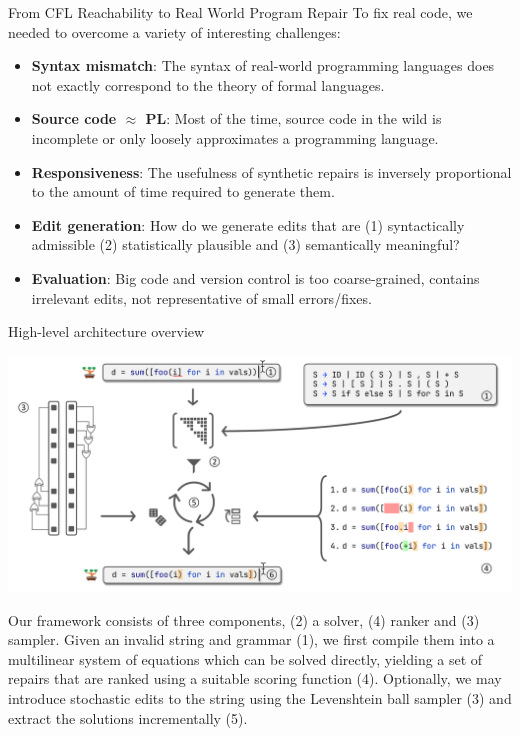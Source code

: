 \documentclass{beamer}
\begin{document}
\begin{frame}[fragile]{From CFL Reachability to Real World Program Repair}
  To fix real code, we needed to overcome a variety of interesting challenges:\vspace{10pt}

  \begin{itemize}
    \item \textbf{Syntax mismatch}: The syntax of real-world programming languages does not exactly correspond to the theory of formal languages.
    \item \textbf{Source code $\approx$ PL}: Most of the time, source code in the wild is incomplete or only loosely approximates a programming language.
    \item \textbf{Responsiveness}: The usefulness of synthetic repairs is inversely proportional to the amount of time required to generate them.
    \item \textbf{Edit generation}: How do we generate edits that are (1) syntactically admissible (2) statistically plausible and (3) semantically meaningful?
    \item \textbf{Evaluation}: Big code and version control is too coarse-grained, contains irrelevant edits, not representative of small errors/fixes.
  \end{itemize}
\end{frame}

\begin{frame}[fragile]{High-level architecture overview}
  \begin{center}
    \includegraphics[width=0.9\linewidth]{../figures/architecture_overview.pdf}
  \end{center}
  \vspace{-10pt}
  \begin{footnotesize}
    Our framework consists of three components, (2) a solver, (4) ranker and (3) sampler. Given an invalid string and grammar (1), we first compile them into a multilinear system of equations which can be solved directly, yielding a set of repairs that are ranked using a suitable scoring function (4). Optionally, we may introduce stochastic edits to the string using the Levenshtein ball sampler (3) and extract the solutions incrementally (5).
  \end{footnotesize}
\end{frame}
\end{document}
